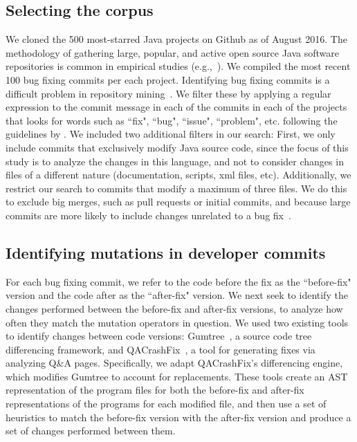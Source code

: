 \documentclass[conference]{IEEEtran}
\begin{document}
\subsection{Selecting the corpus}

We cloned the 500 most-starred Java projects on Github 
as of August 2016. The methodology of 
gathering large,
popular, and active open source Java software repositories is common in
empirical studies (e.g.,~\cite{Ray14}). 
%
We compiled the most recent 100 bug fixing commits per each project. Identifying
bug fixing commits is a difficult
problem in repository mining~\cite{Bird09}. We filter these by applying a
regular expression to the commit message in each of the commits in each of the
projects that looks for words such as ``fix", ``bug", ``issue", ``problem",
etc. following the guidelines by \cite{schroter06,Cubranic05,Fischer03}. 
%
We included two additional filters in our search: First, we only include commits
that exclusively 
modify Java source code, since the focus of this study is to analyze the changes in this language, and not to consider changes in files of a different nature (documentation, scripts, xml files, etc).  Additionally, we restrict our search to commits 
that modify a maximum of three files. We do this to exclude
big merges, such as pull requests or initial commits, and because
large commits are more likely to include changes unrelated to a bug fix~\cite{Dias15,Herzig13,Matsuda15,Kawrykow11}.

\subsection{Identifying mutations in developer commits}
\label{sec:mining}

For each bug fixing commit, we refer to the code before the fix as the
``before-fix" version and the code after as the ``after-fix" version.
We next seek to identify the changes performed between the before-fix and
after-fix versions, to analyze how often they match the mutation operators in
question. 
%
We used two existing tools to identify changes 
between code versions: Gumtree~\cite{falleri14}, a source code tree
differencing framework, and QACrashFix~\cite{gao15}, a tool for generating
fixes via analyzing Q\&A pages.  Specifically, we adapt QACrashFix's
differencing engine, which modifies Gumtree to account for replacements.
These tools create an AST representation of the program files for both the 
before-fix and after-fix representations of the programs for each modified file,
and then use a set of heuristics to match the before-fix version 
with the after-fix version and produce a set of 
changes performed between them. 
\end{document}
